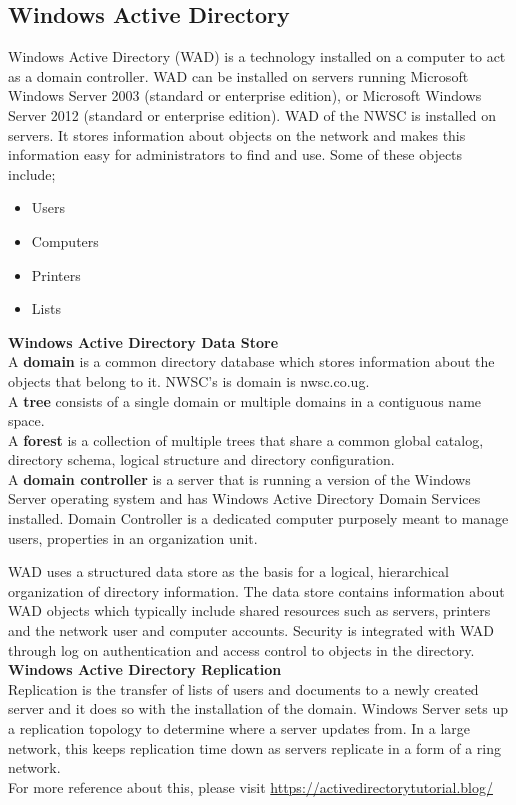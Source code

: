\documentclass{article}
\begin{document}
\subsection{Windows Active Directory}\cite{desmond2008active}
Windows Active Directory (WAD) is a technology installed on a computer to act as a domain controller. WAD can be installed on servers running Microsoft Windows Server 2003 (standard or enterprise edition), or Microsoft Windows Server 2012 (standard or enterprise edition). WAD of the NWSC is installed on servers. It stores information about objects on the network and makes this information easy for administrators to find and use. Some of these objects include;
\begin{itemize}
\item Users
\item  Computers
\item Printers
\item Lists
\end{itemize}
\textbf{Windows Active Directory Data Store}\\
A \textbf{domain} is a common directory database which stores information about the objects that belong to it. NWSC's is domain is nwsc.co.ug.\\
A \textbf{tree} consists of a single domain or multiple domains in a contiguous name space.\\
A \textbf{forest} is a collection of multiple trees that share a common global catalog, directory schema, logical structure and directory configuration.\\
A \textbf{domain controller} is a server that is running a version of the Windows Server operating system and has Windows Active Directory Domain Services installed. Domain Controller is a dedicated computer purposely meant to manage users, properties in an organization unit.
\par WAD uses a structured data store as the basis for a logical, hierarchical organization of directory information. The data store contains information about WAD objects which typically include shared resources such as servers, printers and the network user and computer accounts. Security is integrated with WAD through log on authentication and access control to objects in the directory.\\
\textbf{Windows Active Directory Replication}\\
Replication is the transfer of lists of users and documents to a newly created server and it does so with the installation of the domain. Windows Server sets up a replication topology to determine where a server updates from. In a large network, this keeps replication time down as servers replicate in a form of a ring network.\\
For more reference about this, please visit \url{https://activedirectorytutorial.blog/}
\end{document}
